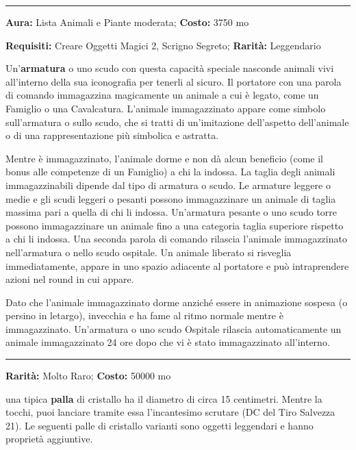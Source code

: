 \begin{multicols}{2}
\smallskip\noindent\rule{\linewidth}{2pt}  \hypertarget{Ospitale}{}\smallskip{}\noindent\label{Ospitale}

\textbf{Aura:} Lista Animali e Piante moderata; \textbf{Costo:} 3750 mo

\textbf{Requisiti:} Creare Oggetti Magici 2, Scrigno Segreto; \textbf{Rarità:} Leggendario

Un'\textbf{armatura} o uno scudo con questa capacità speciale nasconde animali vivi all'interno della sua iconografia per tenerli al sicuro. Il portatore con una parola di comando immagazzina magicamente un animale a cui è legato, come un Famiglio o una Cavalcatura. L'animale immagazzinato appare come simbolo sull'armatura o sullo scudo, che si tratti di un'imitazione dell'aspetto dell'animale o di una rappresentazione più simbolica e astratta.

Mentre è immagazzinato, l'animale dorme e non dà alcun beneficio (come il bonus alle competenze di un Famiglio) a chi la indossa. La taglia degli animali immagazzinabili dipende dal tipo di armatura o scudo. Le armature leggere o medie e gli scudi leggeri o pesanti possono immagazzinare un animale di taglia massima pari a quella di chi li indossa. Un'armatura pesante o uno scudo torre possono immagazzinare un animale fino a una categoria taglia superiore rispetto a chi li indossa. Una seconda parola di comando rilascia l'animale immagazzinato nell'armatura o nello scudo ospitale. Un animale liberato si risveglia immediatamente, appare in uno spazio adiacente al portatore e può intraprendere azioni nel round in cui appare.

Dato che l'animale immagazzinato dorme anziché essere in animazione sospesa (o persino in letargo), invecchia e ha fame al ritmo normale mentre è immagazzinato. Un'armatura o uno scudo Ospitale rilascia automaticamente un animale immagazzinato 24 ore dopo che vi è stato immagazzinato all'interno.

\smallskip\noindent\rule{\linewidth}{2pt}  \hypertarget{PalladiCristallo}{}\smallskip{}\noindent\label{PalladiCristallo}

\textbf{Rarità:} Molto Raro; \textbf{Costo:} 50000 mo

una tipica \textbf{palla} di cristallo ha il diametro di circa 15 centimetri. Mentre la tocchi, puoi lanciare tramite essa l'incantesimo scrutare (DC del Tiro Salvezza 21). Le seguenti palle di cristallo varianti sono oggetti leggendari e hanno proprietà aggiuntive.


\end{multicols}
